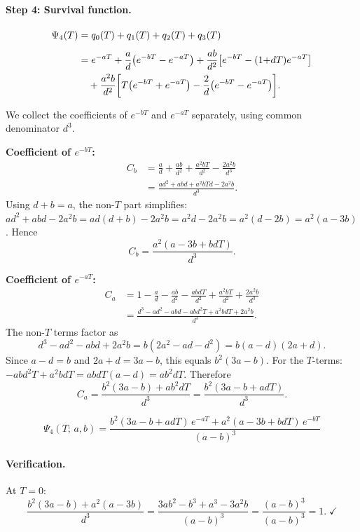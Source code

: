 \documentclass[11pt,a4paper]{article}
\begin{document}
\paragraph{Step 4: Survival function.}
\begin{align}
  \Psi_4(T) &= q_0(T) + q_1(T) + q_2(T) + q_3(T) \notag\\[4pt]
  &= e^{-aT}
     + \frac{a}{d}\bigl(e^{-bT} - e^{-aT}\bigr)
     + \frac{ab}{d^2}\bigl[e^{-bT} - (1{+}dT)e^{-aT}\bigr] \notag\\
  &\quad + \frac{a^2 b}{d^2}\biggl[T\bigl(e^{-bT} + e^{-aT}\bigr)
     - \frac{2}{d}\bigl(e^{-bT} - e^{-aT}\bigr)\biggr]. \label{eq:psi4_expand}
\end{align}

We collect the coefficients of $e^{-bT}$ and $e^{-aT}$ separately, using
common denominator $d^3$.

\medskip
\noindent\textbf{Coefficient of $e^{-bT}$:}
\begin{align*}
  C_b &= \frac{a}{d} + \frac{ab}{d^2} + \frac{a^2 bT}{d^2} - \frac{2a^2 b}{d^3}
  \\[4pt]
  &= \frac{ad^2 + abd + a^2 bTd - 2a^2 b}{d^3}.
\end{align*}
Using $d + b = a$, the non-$T$ part simplifies:
$ad^2 + abd - 2a^2b = ad(d + b) - 2a^2b = a^2d - 2a^2b = a^2(d - 2b) = a^2(a - 3b)$.
Hence
\[
  C_b = \frac{a^2(a - 3b + bdT)}{d^3}.
\]

\medskip
\noindent\textbf{Coefficient of $e^{-aT}$:}
\begin{align*}
  C_a &= 1 - \frac{a}{d} - \frac{ab}{d^2} - \frac{abdT}{d^2}
         + \frac{a^2 bT}{d^2} + \frac{2a^2 b}{d^3}
  \\[4pt]
  &= \frac{d^3 - ad^2 - abd - abd^2T + a^2 bdT + 2a^2 b}{d^3}.
\end{align*}
The non-$T$ terms factor as
\[
  d^3 - ad^2 - abd + 2a^2b = b(2a^2 - ad - d^2) = b(a - d)(2a + d).
\]
Since $a - d = b$ and $2a + d = 3a - b$, this equals $b^2(3a - b)$.
For the $T$-terms: $-abd^2T + a^2bdT = abdT(a - d) = ab^2dT$.
Therefore
\[
  C_a = \frac{b^2(3a - b) + ab^2 dT}{d^3} = \frac{b^2(3a - b + adT)}{d^3}.
\]

\begin{equation}
\boxed{\;\Psi_4(T;\,a,b) = \frac{b^2(3a - b + adT)\,e^{-aT} + a^2(a - 3b + bdT)\,e^{-bT}}{(a-b)^3}\;}
\label{eq:psi4}
\end{equation}

\paragraph{Verification.} At $T = 0$:
\[
  \frac{b^2(3a-b) + a^2(a-3b)}{d^3}
  = \frac{3ab^2 - b^3 + a^3 - 3a^2b}{(a-b)^3}
  = \frac{(a - b)^3}{(a-b)^3}
  = 1. \;\checkmark
\]
\end{document}
